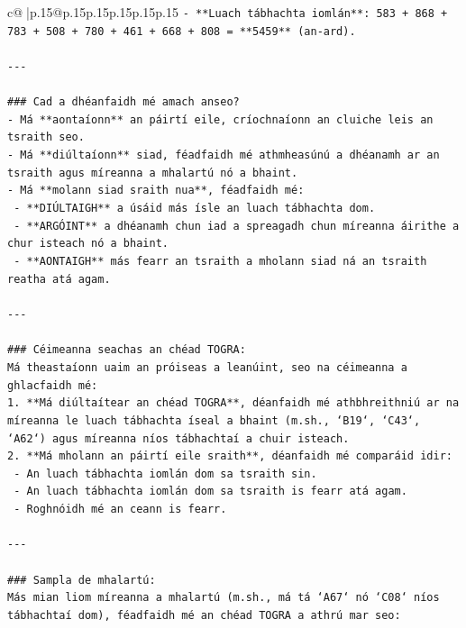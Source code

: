 \documentclass{article}
\begin{document}
{\begin{supertabular}{c@{$\;$}|p{.15\linewidth}@{}p{.15\linewidth}p{.15\linewidth}p{.15\linewidth}p{.15\linewidth}p{.15\linewidth}}
{{{\texttt{{-} **Luach tábhachta iomlán**: 583 + 868 + 783 + 508 + 780 + 461 + 668 + 808 = **5459** (an{-}ard).} \\
\\ 
\texttt{{-}{-}{-}} \\
\\ 
\texttt{\#\#\# Cad a dhéanfaidh mé amach anseo?} \\
\texttt{{-} Má **aontaíonn** an páirtí eile, críochnaíonn an cluiche leis an tsraith seo.} \\
\texttt{{-} Má **diúltaíonn** siad, féadfaidh mé athmheasúnú a dhéanamh ar an tsraith agus míreanna a mhalartú nó a bhaint.} \\
\texttt{{-} Má **molann siad sraith nua**, féadfaidh mé:} \\
\texttt{  {-} **DIÚLTAIGH** a úsáid más ísle an luach tábhachta dom.} \\
\texttt{  {-} **ARGÓINT** a dhéanamh chun iad a spreagadh chun míreanna áirithe a chur isteach nó a bhaint.} \\
\texttt{  {-} **AONTAIGH** más fearr an tsraith a mholann siad ná an tsraith reatha atá agam.} \\
\\ 
\texttt{{-}{-}{-}} \\
\\ 
\texttt{\#\#\# Céimeanna seachas an chéad TOGRA:} \\
\texttt{Má theastaíonn uaim an próiseas a leanúint, seo na céimeanna a ghlacfaidh mé:} \\
\texttt{1. **Má diúltaítear an chéad TOGRA**, déanfaidh mé athbhreithniú ar na míreanna le luach tábhachta íseal a bhaint (m.sh., `B19`, `C43`, `A62`) agus míreanna níos tábhachtaí a chuir isteach.} \\
\texttt{2. **Má mholann an páirtí eile sraith**, déanfaidh mé comparáid idir:} \\
\texttt{   {-} An luach tábhachta iomlán dom sa tsraith sin.} \\
\texttt{   {-} An luach tábhachta iomlán dom sa tsraith is fearr atá agam.} \\
\texttt{   {-} Roghnóidh mé an ceann is fearr.} \\
\\ 
\texttt{{-}{-}{-}} \\
\\ 
\texttt{\#\#\# Sampla de mhalartú:} \\
\texttt{Más mian liom míreanna a mhalartú (m.sh., má tá `A67` nó `C08` níos tábhachtaí dom), féadfaidh mé an chéad TOGRA a athrú mar seo:} \\
}}}
\end{supertabular}}
\end{document}
